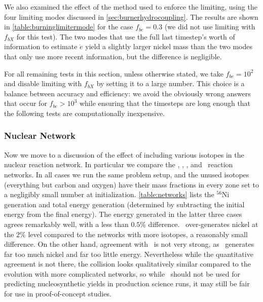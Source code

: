 \documentclass[12pt]{article}
\begin{document}
We also examined the effect of the method used to enforce the limiting, using the
four limiting modes discussed in \autoref{sec:burnerhydrocoupling}. The results are shown
in \autoref{table:burninglimitermode} for the case $f_{be} = 0.3$ (we did not use
limiting with $f_{bX}$ for this test). The two modes that use the full last timestep's
worth of information to estimate $\dot{e}$ yield a slightly larger nickel mass than the
two modes that only use more recent information, but the difference is negligible.



For all remaining tests in this section, unless otherwise stated, we take $f_{be} = 10^2$
and disable limiting with $f_{bX}$ by setting it to a large number. This choice is a balance
between accuracy and efficiency: we avoid the obviously wrong answers that occur for $f_{be} > 10^3$
while ensuring that the timesteps are long enough that the following tests are computationally
inexpensive.

\subsubsection{Nuclear Network}
\label{sec:collision_parameters:network}

Now we move to a discussion of the effect of including various isotopes
in the nuclear reaction network. In particular we compare the \isoseven, \aproxthirteen,
\aproxnineteen, and \aproxtwentyone\ reaction networks. In all cases we run
the same problem setup, and the unused isotopes (everything but carbon and oxygen)
have their mass fractions in every zone set to a negligibly small number at initialization.
\autoref{table:networks} lists the $^{56}$Ni generation and total energy generation (determined
by subtracting the initial energy from the final energy). The energy generated in the latter
three cases agrees remarkably well, with a less than $0.5\%$ difference. \aproxthirteen\
over-generates nickel at the $2\%$ level compared to the networks with more isotopes, a reasonably
small difference. On the other hand, agreement with \isoseven\ is not very strong, as \isoseven\
generates far too much nickel and far too little energy. Nevertheless while the quantitative
agreement is not there, the collision looks qualitatively similar compared to the evolution with
more complicated networks, so while \isoseven\ should not be used for predicting nucleosynthetic
yields in production science runs, it may still be fair for use in proof-of-concept studies.
\end{document}
